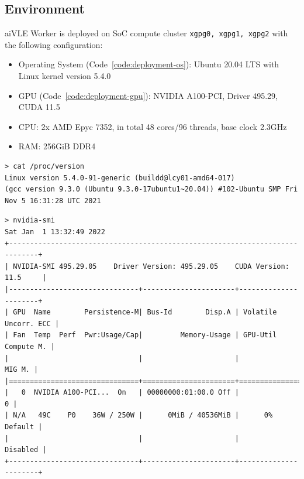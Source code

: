 \documentclass[fyp]{socreport}
\newenvironment{code}{\captionsetup{type=listing}}{}
\begin{document}
\subsection{Environment}
\label{ss:deployment-environment}
aiVLE Worker is deployed on SoC compute cluster \texttt{xgpg0, xgpg1, xgpg2} with the following configuration:
\begin{itemize}
    \item Operating System (Code~\ref{code:deployment-os}): Ubuntu 20.04 LTS with Linux kernel version 5.4.0
    \item GPU (Code~\ref{code:deployment-gpu}): NVIDIA A100-PCI, Driver 495.29, CUDA 11.5
    \item CPU: 2x AMD Epyc 7352, in total 48 cores/96 threads, base clock 2.3GHz
    \item RAM: 256GiB DDR4
\end{itemize}

\begin{code}
\begin{verbatim}
> cat /proc/version
Linux version 5.4.0-91-generic (buildd@lcy01-amd64-017) 
(gcc version 9.3.0 (Ubuntu 9.3.0-17ubuntu1~20.04)) #102-Ubuntu SMP Fri Nov 5 16:31:28 UTC 2021
\end{verbatim}
\label{code:deployment-os}
\end{code}

\begin{code}
\begin{verbatim}
> nvidia-smi 
Sat Jan  1 13:32:49 2022       
+-----------------------------------------------------------------------------+
| NVIDIA-SMI 495.29.05    Driver Version: 495.29.05    CUDA Version: 11.5     |
|-------------------------------+----------------------+----------------------+
| GPU  Name        Persistence-M| Bus-Id        Disp.A | Volatile Uncorr. ECC |
| Fan  Temp  Perf  Pwr:Usage/Cap|         Memory-Usage | GPU-Util  Compute M. |
|                               |                      |               MIG M. |
|===============================+======================+======================|
|   0  NVIDIA A100-PCI...  On   | 00000000:01:00.0 Off |                    0 |
| N/A   49C    P0    36W / 250W |      0MiB / 40536MiB |      0%      Default |
|                               |                      |             Disabled |
+-------------------------------+----------------------+----------------------+
\end{verbatim}
\label{code:deployment-gpu}
\end{code}
\end{document}
